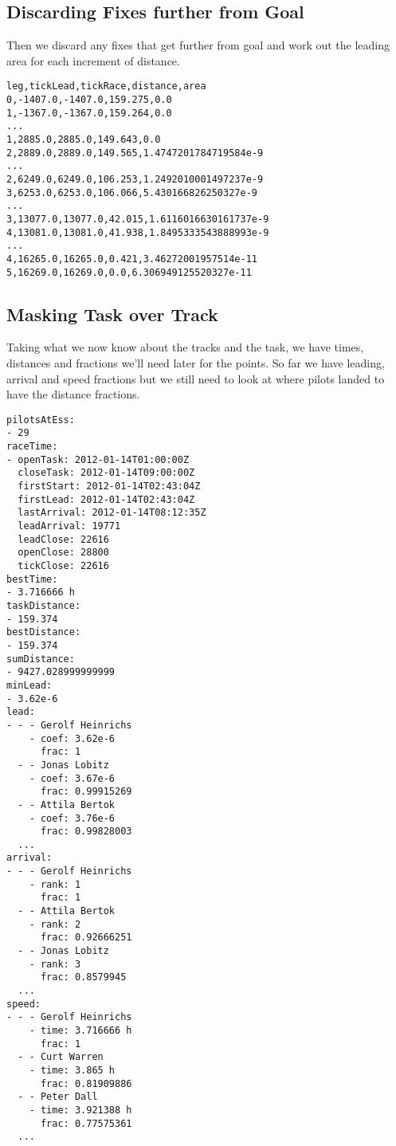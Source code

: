 \documentclass[gap.tex]{subfiles}
\begin{document}
\subsection{Discarding Fixes further from Goal}

Then we discard any fixes that get further from goal and work out the leading
area for each increment of distance.

\begin{lstlisting}[caption={Fixes getting closer to goal with leading area, rows of \texttt{*.discard-further.csv}}]
leg,tickLead,tickRace,distance,area
0,-1407.0,-1407.0,159.275,0.0
1,-1367.0,-1367.0,159.264,0.0
...
1,2885.0,2885.0,149.643,0.0
2,2889.0,2889.0,149.565,1.4747201784719584e-9
...
2,6249.0,6249.0,106.253,1.2492010001497237e-9
3,6253.0,6253.0,106.066,5.430166826250327e-9
...
3,13077.0,13077.0,42.015,1.6116016630161737e-9
4,13081.0,13081.0,41.938,1.8495333543888993e-9
...
4,16265.0,16265.0,0.421,3.46272001957514e-11
5,16269.0,16269.0,0.0,6.306949125520327e-11
\end{lstlisting}

\newpage
\subsection{Masking Task over Track}

Taking what we now know about the tracks and the task, we have times, distances
and fractions we'll need later for the points. So far we have leading, arrival
and speed fractions but we still need to look at where pilots landed to have
the distance fractions.

\begin{lstlisting}[caption={Leading, arrival and speed fractions of \texttt{*.mask-track.yaml}}]
pilotsAtEss:
- 29
raceTime:
- openTask: 2012-01-14T01:00:00Z
  closeTask: 2012-01-14T09:00:00Z
  firstStart: 2012-01-14T02:43:04Z
  firstLead: 2012-01-14T02:43:04Z
  lastArrival: 2012-01-14T08:12:35Z
  leadArrival: 19771
  leadClose: 22616
  openClose: 28800
  tickClose: 22616
bestTime:
- 3.716666 h
taskDistance:
- 159.374
bestDistance:
- 159.374
sumDistance:
- 9427.028999999999
minLead:
- 3.62e-6
lead:
- - - Gerolf Heinrichs
    - coef: 3.62e-6
      frac: 1
  - - Jonas Lobitz
    - coef: 3.67e-6
      frac: 0.99915269
  - - Attila Bertok
    - coef: 3.76e-6
      frac: 0.99828003
  ...
arrival:
- - - Gerolf Heinrichs
    - rank: 1
      frac: 1
  - - Attila Bertok
    - rank: 2
      frac: 0.92666251
  - - Jonas Lobitz
    - rank: 3
      frac: 0.8579945
  ...
speed:
- - - Gerolf Heinrichs
    - time: 3.716666 h
      frac: 1
  - - Curt Warren
    - time: 3.865 h
      frac: 0.81909886
  - - Peter Dall
    - time: 3.921388 h
      frac: 0.77575361
  ...
\end{lstlisting}
\end{document}
